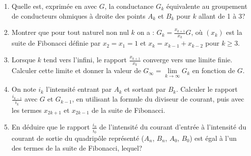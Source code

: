 \begin{exercice}%
  \begin{enumerate}
    \item Quelle est, exprimée en avec \(G\), la conductance \(G_k\) 
      équivalente au groupement de conducteurs ohmiques à droite des points 
      \(A_k\) et \(B_k\) pour \(k\) allant de 1 à 3?
    \item Montrer que pour tout naturel non nul \(k\) on a : \(G_k = 
      \frac{x_{k+1}}{x_k} G\), où \((x_k)\) est la suite de Fibonacci définie 
      par \(x_2=x_1=1\) et \(x_k = x_{k-1}+x_{k-2}\) pour \(k \geq 3\).
    \item Lorsque \(k\) tend vers l'infini, le rapport \(\frac{x_{k+1}}{x_k}\) 
      converge vers une limite finie. Calculer cette limite et donner la valeur 
      de \(G_\infty = \lim\limits_{k \to \infty} G_k\) en fonction de \(G\).
    \item On note \(i_k\) l'intensité entrant par \(A_k\) et sortant par 
      \(B_k\). Calculer le rapport \(\frac{i_{k-1}}{i_k}\) avec \(G\) et 
      \(G_{k-1}\), en utilisant la formule du diviseur de courant, puis avec 
      les termes \(x_{2k+1}\) et \(x_{2k-1}\) de la suite de Fibonacci.
    \item En déduire que le rapport \(\frac{i_n}{i_0}\) de l'intensité du 
      courant d'entrée à l'intensité du courant de sortie du quadripôle 
      représenté (\(A_n\), \(B_n\), \(A_0\), \(B_0\)) est égal à l'un des 
      termes de la suite de Fibonacci, lequel?
  \end{enumerate}
\end{exercice}%
